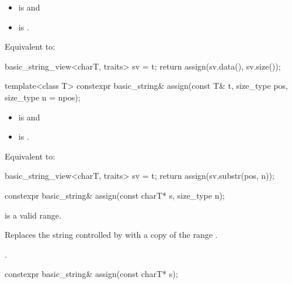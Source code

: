\begin{itemdescr}
\pnum
\constraints
\begin{itemize}
\item
{} is
 and
\item
{} is
.
\end{itemize}

\pnum
\effects
Equivalent to:
\begin{codeblock}
basic_string_view<charT, traits> sv = t;
return assign(sv.data(), sv.size());
\end{codeblock}
\end{itemdescr}

%
\begin{itemdecl}
template<class T>
  constexpr basic_string& assign(const T& t, size_type pos, size_type n = npos);
\end{itemdecl}

\begin{itemdescr}
\pnum
\constraints
\begin{itemize}
\item
{} is
 and
\item
{} is
.
\end{itemize}

\pnum
\effects
Equivalent to:
\begin{codeblock}
basic_string_view<charT, traits> sv = t;
return assign(sv.substr(pos, n));
\end{codeblock}
\end{itemdescr}

%
\begin{itemdecl}
constexpr basic_string& assign(const charT* s, size_type n);
\end{itemdecl}

\begin{itemdescr}
\pnum
\expects
{} is a valid range.

\pnum
\effects
Replaces the string controlled by  with
a copy of the range .

\pnum
\returns
{}.
\end{itemdescr}

%
\begin{itemdecl}
constexpr basic_string& assign(const charT* s);
\end{itemdecl}

